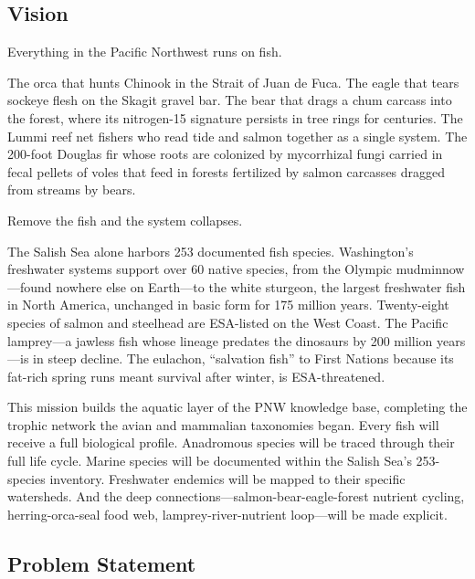 \documentclass[11pt,letterpaper]{article}
\begin{document}
\subsection{Vision}

Everything in the Pacific Northwest runs on fish.

The orca that hunts Chinook in the Strait of Juan de Fuca. The eagle that tears sockeye flesh on the Skagit gravel bar. The bear that drags a chum carcass into the forest, where its nitrogen-15 signature persists in tree rings for centuries. The Lummi reef net fishers who read tide and salmon together as a single system. The 200-foot Douglas fir whose roots are colonized by mycorrhizal fungi carried in fecal pellets of voles that feed in forests fertilized by salmon carcasses dragged from streams by bears.

Remove the fish and the system collapses.

The Salish Sea alone harbors 253 documented fish species. Washington's freshwater systems support over 60 native species, from the Olympic mudminnow---found nowhere else on Earth---to the white sturgeon, the largest freshwater fish in North America, unchanged in basic form for 175 million years. Twenty-eight species of salmon and steelhead are ESA-listed on the West Coast. The Pacific lamprey---a jawless fish whose lineage predates the dinosaurs by 200 million years---is in steep decline. The eulachon, ``salvation fish'' to First Nations because its fat-rich spring runs meant survival after winter, is ESA-threatened.

This mission builds the aquatic layer of the PNW knowledge base, completing the trophic network the avian and mammalian taxonomies began. Every fish will receive a full biological profile. Anadromous species will be traced through their full life cycle. Marine species will be documented within the Salish Sea's 253-species inventory. Freshwater endemics will be mapped to their specific watersheds. And the deep connections---salmon-bear-eagle-forest nutrient cycling, herring-orca-seal food web, lamprey-river-nutrient loop---will be made explicit.

\subsection{Problem Statement}
\end{document}
